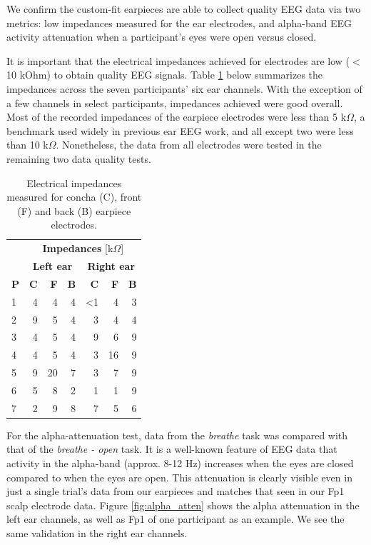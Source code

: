 \documentclass{sigchi}
\begin{document}
We confirm the custom-fit earpieces are able to collect quality EEG data via two metrics: low impedances measured for the ear electrodes, and alpha-band EEG activity attenuation when a participant's eyes were open versus closed.

It is important that the electrical impedances achieved for electrodes are low ($<$10 kOhm) to obtain quality EEG signals. Table \ref{tab:impedances} below summarizes the impedances across the seven participants' six ear channels. With the exception of a few channels in select participants, impedances achieved were good overall. Most of the recorded impedances of the earpiece electrodes were less than 5 k\(\Omega\), a benchmark used widely in previous ear EEG work, and all except two were less than 10 k\(\Omega\). Nonetheless, the data from all electrodes were tested in the remaining two data quality tests.

\begin{table}[h]
\begin{center}
\begin{tabular}{lrrrrrr}
& \multicolumn{6}{c}{\textbf{Impedances} [k\(\Omega\)]} \\
\cline{2-7}
& \multicolumn{3}{|c|}{\textbf{Left ear}} & \multicolumn{3}{c|}{\textbf{Right ear}} \\
\textbf{P} & \textbf{C} & \textbf{F} & \textbf{B} & \textbf{C} & \textbf{F} & \textbf{B} \\
\hline
1 & 4 & 4 & 4 & \textless1 & 4 & 3\\
2 & 9 & 5 & 4 & 3 & 4 & 4\\
3 & 4 & 5 & 4 & 9 & 6 & 9\\
4 & 4 & 5 & 4 & 3 & 16 & 9\\
5 & 9 & 20 & 7 & 3 & 7 & 9\\
6 & 5 & 8 & 2 & 1 & 1 & 9\\
7 & 2 & 9 & 8 & 7 & 5 & 6\\
\end{tabular}
\end{center}
\caption{Electrical impedances measured for concha (C), front (F) and back (B) earpiece electrodes.}
\label{tab:impedances}
\end{table}

For the alpha-attenuation test, data from the \textit{breathe} task was compared with that of the \textit{breathe - open} task. It is a well-known feature of EEG data that activity in the alpha-band (approx. 8-12 Hz) increases when the eyes are closed compared to when the eyes are open. This attenuation is clearly visible even in just a single trial's data from our earpieces and matches that seen in our Fp1 scalp electrode data. Figure \ref{fig:alpha_atten} shows the alpha attenuation in the left ear channels, as well as Fp1 of one participant as an example. We see the same validation in the right ear channels.
\end{document}
